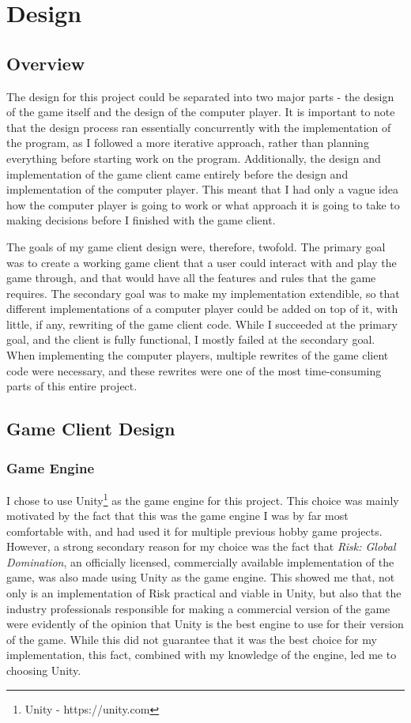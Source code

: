 \graphicspath{ {./Images/} }
\chapter{Design}
\label{design}
\section{Overview}
\label{overview}
The design for this project could be separated into two major parts - the design of the game itself and the design of the computer player. It is important to note that the design process ran essentially concurrently with the implementation of the program, as I followed a more iterative approach, rather than planning everything before starting work on the program. Additionally, the design and implementation of the game client came entirely before the design and implementation of the computer player. This meant that I had only a vague idea how the computer player is going to work or what approach it is going to take to making decisions before I finished with the game client.

The goals of my game client design were, therefore, twofold. The primary goal was to create a working game client that a user could interact with and play the game through, and that would have all the features and rules that the game requires. The secondary goal was to make my implementation extendible, so that different implementations of a computer player could be added on top of it, with little, if any, rewriting of the game client code. While I succeeded at the primary goal, and the client is fully functional, I mostly failed at the secondary goal. When implementing the computer players, multiple rewrites of the game client code were necessary, and these rewrites were one of the most time-consuming parts of this entire project.

\section{Game Client Design}
\label{gameClientDesign}
\subsection{Game Engine}
\label{gameEngine}
I chose to use Unity\footnote{Unity - https://unity.com} as the game engine for this project. This choice was mainly motivated by the fact that this was the game engine I was by far most comfortable with, and had used it for multiple previous hobby game projects. However, a strong secondary reason for my choice was the fact that \textit{Risk: Global Domination}, an officially licensed, commercially available implementation of the game, was also made using Unity as the game engine. This showed me that, not only is an implementation of Risk practical and viable in Unity, but also that the industry professionals responsible for making a commercial version of the game were evidently of the opinion that Unity is the best engine to use for their version of the game. While this did not guarantee that it was the best choice for my implementation, this fact, combined with my knowledge of the engine, led me to choosing Unity.


